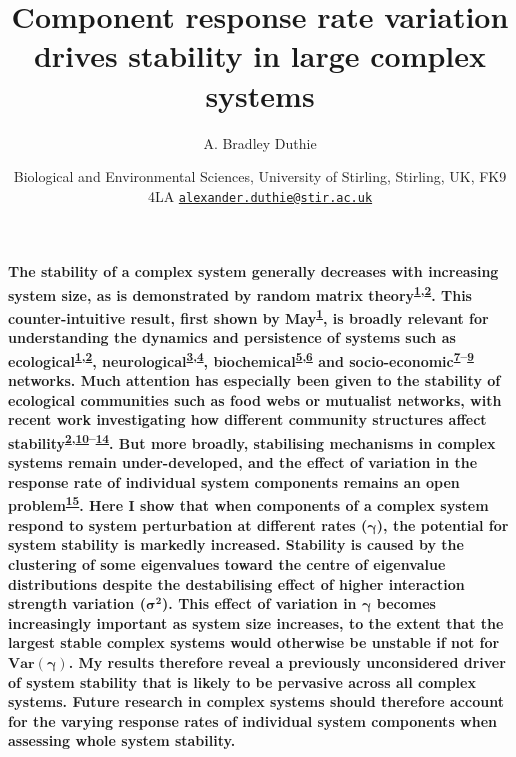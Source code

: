 \documentclass[]{article}
\title{Component response rate variation drives stability in large complex
systems}
\author{A. Bradley Duthie}
\date{Biological and Environmental Sciences, University of Stirling, Stirling,
UK, FK9 4LA
\href{mailto:alexander.duthie@stir.ac.uk}{\nolinkurl{alexander.duthie@stir.ac.uk}}}
\begin{document}
\maketitle

\textbf{The stability of a complex system generally decreases with
increasing system size, as is demonstrated by random matrix
theory\textsuperscript{\protect\hyperlink{ref-May1972}{1},\protect\hyperlink{ref-Allesina2012}{2}}.
This counter-intuitive result, first shown by
May\textsuperscript{\protect\hyperlink{ref-May1972}{1}}, is broadly
relevant for understanding the dynamics and persistence of systems such
as
ecological\textsuperscript{\protect\hyperlink{ref-May1972}{1},\protect\hyperlink{ref-Allesina2012}{2}},
neurological\textsuperscript{\protect\hyperlink{ref-Gray2008}{3},\protect\hyperlink{ref-Gray2009}{4}},
biochemical\textsuperscript{\protect\hyperlink{ref-Rosenfeld2009}{5},\protect\hyperlink{ref-MacArthur2010}{6}}
and
socio-economic\textsuperscript{\protect\hyperlink{ref-Haldane2011}{7}--\protect\hyperlink{ref-Bardoscia2017}{9}}
networks. Much attention has especially been given to the stability of
ecological communities such as food webs or mutualist networks, with
recent work investigating how different community structures affect
stability\textsuperscript{\protect\hyperlink{ref-Allesina2012}{2},\protect\hyperlink{ref-Mougi2012}{10}--\protect\hyperlink{ref-Patel2018}{14}}.
But more broadly, stabilising mechanisms in complex systems remain
under-developed, and the effect of variation in the response rate of
individual system components remains an open
problem\textsuperscript{\protect\hyperlink{ref-Allesina2015}{15}}. Here
I show that when components of a complex system respond to system
perturbation at different rates (\(\boldsymbol{\gamma}\)), the potential for
system stability is markedly increased. Stability is caused by the
clustering of some eigenvalues toward the centre of eigenvalue
distributions despite the destabilising effect of higher interaction
strength variation (\(\boldsymbol{\sigma^{2}}\)). This effect of
variation in \(\boldsymbol{\gamma}\) becomes increasingly important as
system size increases, to the extent that the largest stable complex
systems would otherwise be unstable if not for
\(\boldsymbol{Var(\gamma)}\). My results therefore reveal a previously
unconsidered driver of system stability that is likely to be pervasive
across all complex systems. Future research in complex systems should
therefore account for the varying response rates of individual system
components when assessing whole system stability.}
\end{document}
